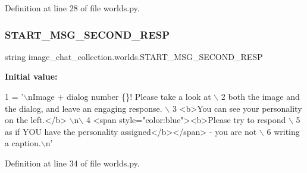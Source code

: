 Definition at line 28 of file worlds.\+py.

\mbox{\label{namespaceimage__chat__collection_1_1worlds_a7c4dd5af21b4ff103ff116d541e1251e}} 
\subsubsection{\texorpdfstring{S\+T\+A\+R\+T\+\_\+\+M\+S\+G\+\_\+\+S\+E\+C\+O\+N\+D\+\_\+\+R\+E\+SP}{START\_MSG\_SECOND\_RESP}}
{\footnotesize\ttfamily string image\+\_\+chat\+\_\+collection.\+worlds.\+S\+T\+A\+R\+T\+\_\+\+M\+S\+G\+\_\+\+S\+E\+C\+O\+N\+D\+\_\+\+R\+E\+SP}

{\bfseries Initial value\+:}
\begin{DoxyCode}
1 =  \textcolor{stringliteral}{'\(\backslash\)nImage + dialog number \{\}! Please take a look at \(\backslash\)}
2 \textcolor{stringliteral}{        both the image and the dialog, and leave an engaging response. \(\backslash\)}
3 \textcolor{stringliteral}{        <b>You can see your personality on the left.</b> \(\backslash\)n\(\backslash\)}
4 \textcolor{stringliteral}{        <span style="color:blue"><b>Please try to respond \(\backslash\)}
5 \textcolor{stringliteral}{        as if YOU have the personality assigned</b></span> - you are not \(\backslash\)}
6 \textcolor{stringliteral}{        writing a caption.\(\backslash\)n'}
\end{DoxyCode}


Definition at line 34 of file worlds.\+py.

\mbox{\label{namespaceimage__chat__collection_1_1worlds_ad0ef7ea4d3a4f603b9c9c52700aea80f}} 
